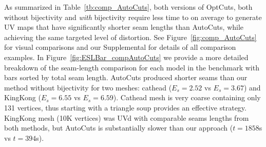 As summarized in Table~\ref{tb:comp_AutoCuts}, both versions of OptCuts, both without bijectivity and \emph{with} bijectivity require less time to on average to generate UV maps that have significantly shorter seam lengths than AutoCuts, while achieving the same targeted level of distortion. See  Figure~\ref{fig:comp_AutoCuts} for visual comparisons and our Supplemental for details of all comparison examples. In Figure~\ref{fig:ESLBar_compAutoCuts} we provide a more detailed breakdown of the seam-length comparison for each model in the benchmark with bars sorted by total seam length. 
%
AutoCuts produced shorter seams than our method without bijectivity for two meshes: cathead ($E_s\!=\!2.52$ vs $E_s\!=\!3.67$) and KingKong ($E_s\!=\!6.55$ vs $E_s\!=\!6.59$). Cathead mesh is very coarse containing only 131 vertices, thus starting with a triangle soup provides an effective strategy. KingKong mesh (10K vertices) was UVd with comparable seams lengths from both methods, but AutoCuts is substantially slower than our approach ($t\!=\!1858$s vs $t\!=\!394$s).





